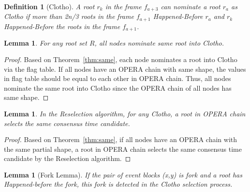 \documentclass{article}
\newtheorem{lem}[thm]{Lemma}
\newtheorem{defn}{Definition}[section]
\newcommand{\efork}{\pitchfork}
\newcommand{\hbefore}{\rightarrow}
\begin{document}
\begin{defn}[Clotho]
	A root $r_k$ in the frame $f_{a+3}$ can nominate a root $r_a$ as Clotho if more than 2n/3 roots in the frame $f_{a+1}$ Happened-Before $r_a$ and $r_k$ Happened-Before the roots in the frame $f_{a+1}$.
\end{defn} 

\begin{lem}
	\label{lem:root}
	For any root set $R$, all nodes nominate same root into Clotho.
\end{lem}

\begin{proof}
	Based on Theorem~\ref{thm:same}, each node nominates a root into Clotho via the flag table. If all nodes have an OPERA chain with same shape, the values in flag table should be equal to each other in OPERA chain. Thus, all nodes nominate the same root into Clotho since the OPERA chain of all nodes has same shape.
\end{proof}

\begin{lem}
	\label{lem:resel}
	In the Reselection algorithm, for any Clotho, a root in OPERA chain selects the same consensus time candidate.
\end{lem}

\begin{proof}
	Based on Theorem~\ref{thm:same}, if all nodes have an OPERA chain with the same partial shape, a root in OPERA chain selects the same consensus time candidate by the Reselection algorithm.
\end{proof}


\begin{lem}[Fork Lemma]
	\label{lem:fork}
	If the pair of event blocks (x,y) is fork and a root has Happened-before the fork, this fork is detected in the Clotho selection process.
\end{lem}
\end{document}
